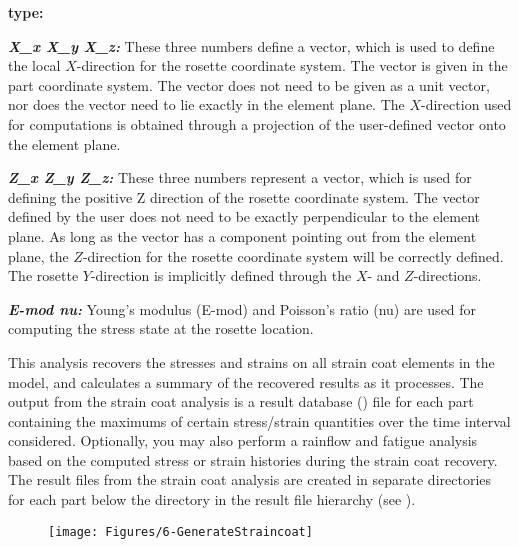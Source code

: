 \begin{namelist}{\bf type:}
\item[\sl\textbf{X\_x X\_y X\_z:}]
  These three numbers define a vector, which is used to define the local
  $X$-direction for the rosette coordinate system. The vector is given in
  the part coordinate system. The vector does not need to be given as a unit
  vector, nor does the vector need to lie exactly in the element plane.
  The $X$-direction used for computations is obtained through a projection
  of the user-defined vector onto the element plane.

\item[\sl\textbf{Z\_x Z\_y Z\_z:}]
  These three numbers represent a vector, which is used for defining
  the positive Z direction of the rosette coordinate system.
  The vector defined by the user does not need to be exactly perpendicular
  to the element plane. As long as the vector has a component pointing
  out from the element plane, the $Z$-direction for the rosette coordinate
  system will be correctly defined.
  The rosette $Y$-direction is implicitly defined through the $X$-
  and $Z$-directions.

\item[\sl\textbf{E-mod nu:}] Young's modulus (E-mod) and Poisson's ratio (nu)
  are used for computing the stress state at the rosette location.
\end{namelist}



This analysis recovers the stresses and strains on all strain coat elements in
the model, and calculates a summary of the recovered results as it processes.
The output from the strain coat analysis is a result database ()
file for each part containing the maximums of certain stress/strain quantities
over the time interval considered.
Optionally, you may also perform a rainflow and fatigue analysis based on the
computed stress or strain histories during the strain coat recovery.
The result files from the strain coat analysis are created in separate
directories for each part below the  directory in
the result file hierarchy
(see ).

\clearpage



\begin{wrapfigure}[17]{r}{0.35\textwidth} \vskip-5mm
  \texttt{[image: Figures/6-GenerateStraincoat]}
\end{wrapfigure}

